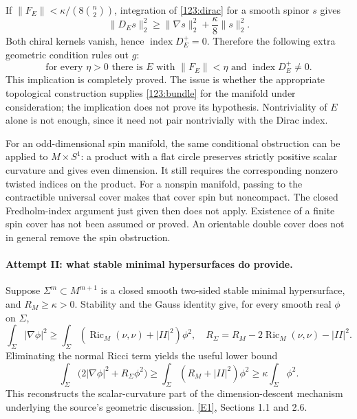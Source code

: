 \documentclass[11pt,a4paper]{article}
\newcommand{\eref}[2]{\hyperlink{extra:#1:#2}{[E#2]}}
\numberwithin{equation}{section}
\begin{document}
If $\|F_E\|<\kappa/(8\binom n2)$, integration of
\eqref{123:dirac} for a smooth spinor $s$ gives
\[
 \|D_Es\|_2^2\geq\|\nabla s\|_2^2+\frac\kappa8\|s\|_2^2.
\]
Both chiral kernels vanish, hence $\operatorname{index}D_E^+=0$.
Therefore the following extra geometric condition rules out $g$:
\begin{equation}\label{123:bundle}
 \text{for every $\eta>0$ there is $E$ with }
 \|F_E\|<\eta\text{ and }\operatorname{index}D_E^+\ne0.
\end{equation}
This implication is completely proved.  The issue is whether the
appropriate topological construction supplies \eqref{123:bundle} for
the manifold under consideration; the implication does not prove its
hypothesis.  Nontriviality of $E$ alone is not enough, since it need not
pair nontrivially with the Dirac index.

For an odd-dimensional spin manifold, the same conditional obstruction
can be applied to $M\times S^1$: a product with a flat circle preserves
strictly positive scalar curvature and gives even dimension.  It still
requires the corresponding nonzero twisted indices on the product.
For a nonspin manifold, passing to the contractible universal cover
makes that cover spin but noncompact.  The closed Fredholm-index
argument just given then does not apply.  Existence of a finite spin
cover has not been assumed or proved.  An orientable double cover does
not in general remove the spin obstruction.

\paragraph{Attempt II: what stable minimal hypersurfaces do provide.}
Suppose $\Sigma^m\subset M^{m+1}$ is a closed smooth two-sided stable
minimal hypersurface, and $R_M\geq\kappa>0$.  Stability and the Gauss
identity give, for every smooth real $\phi$ on $\Sigma$,
\[
 \int_\Sigma|\nabla\phi|^2\geq
 \int_\Sigma(\operatorname{Ric}_M(\nu,\nu)+|II|^2)\phi^2,
 \quad
 R_\Sigma=R_M-2\operatorname{Ric}_M(\nu,\nu)-|II|^2.
\]
Eliminating the normal Ricci term yields the useful lower bound
\begin{equation}\label{123:stable}
 \int_\Sigma\bigl(2|\nabla\phi|^2+R_\Sigma\phi^2\bigr)
 \geq\int_\Sigma(R_M+|II|^2)\phi^2
 \geq\kappa\int_\Sigma\phi^2.
\end{equation}
This reconstructs the scalar-curvature part of the dimension-descent
mechanism underlying the source's geometric discussion.
\eref{123}{1}, Sections 1.1 and 2.6.
\end{document}
